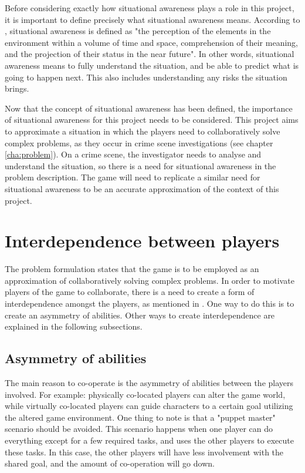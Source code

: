 		Before considering exactly how situational awareness plays a role in this
		project, it is important to define precisely what situational awareness
		means. According to \cite{endsley}, situational awareness is defined as
		"the perception of the elements in the environment within a volume of
		time and space, comprehension of their meaning, and the projection of
		their status in the near future". In other words, situational awareness
		means to fully understand the situation, and be able to predict what is
		going to happen next. This also includes understanding any risks the
		situation brings.

		Now that the concept of situational awareness has been defined, the
		importance of situational awareness for this project needs to be
		considered. This project aims to approximate a situation in which the
		players need to collaboratively solve complex problems, as they occur in
		crime scene investigations (see chapter \ref{cha:problem}). On a crime
		scene, the investigator needs to analyse and understand the situation,
		so there is a need for situational awareness in the problem description.
		The game will need to replicate a similar need for situational awareness
		to be an accurate approximation of the context of this project.

	\section{Interdependence between players} \label{sec:interdependence}
		The problem formulation states that the game is to be employed as an
		approximation of collaboratively solving complex problems. In order to
		motivate players of the game to collaborate, there is a need to create
		a form of interdependence amongst the players, as mentioned in
		\cite{zagal}. One way to do this is to create an asymmetry of abilities.
		Other ways to create interdependence are explained in the following
		subsections.
		\subsection{Asymmetry of abilities}
			The main reason to co-operate is the asymmetry of abilities between
			the players involved. For example: physically co-located players can
			alter the game world, while virtually co-located players can guide
			characters to a certain goal utilizing the altered game environment.
			One thing to note is that a "puppet master" scenario should be
			avoided. This scenario happens when one player can do everything
			except for a few required tasks, and uses the other players to
			execute these tasks. In this case, the other players will have less
			involvement with the shared goal, and the amount of co-operation
			will go down.
